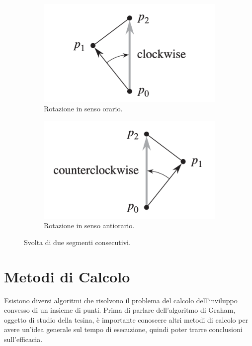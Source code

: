 \documentclass[12pt,a4paper]{report}
\begin{document}
\begin{figure}[ht]
\centering
 \begin{subfigure}{.4\textwidth}
    \centering
    \includegraphics[width=1\linewidth]{clockwise.png}
    \caption{Rotazione in senso orario.}
    \label{fig:clockwise}
 \end{subfigure}
 \begin{subfigure}{.4\textwidth}
    \centering
    \includegraphics[width=1\linewidth]{anticlockwise.png}
    \caption{Rotazione in senso antiorario.}
    \label{fig:anticlockwise}
 \end{subfigure}
 \caption{Svolta di due segmenti consecutivi.}
\end{figure}

\section{Metodi di Calcolo}
Esistono diversi algoritmi che risolvono il problema del calcolo dell'inviluppo convesso di un insieme di punti. Prima di parlare dell'algoritmo di Graham, oggetto di studio della tesina, è importante conoscere altri metodi di calcolo per avere un'idea generale sul tempo di esecuzione, quindi poter trarre conclusioni sull'efficacia.\\
\end{document}
